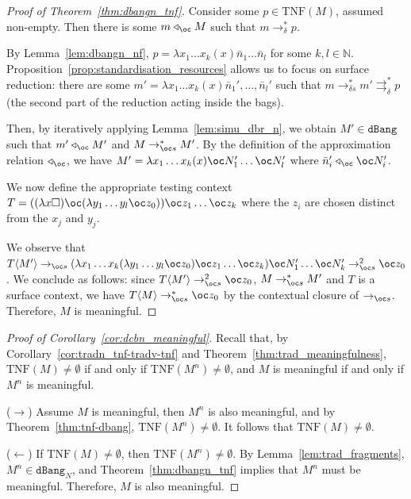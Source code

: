 \documentclass[10pt,a4paper]{article}
\newcommand{\<}{\langle}
\renewcommand{\>}{\rangle}
\newcommand{\dbang}{\ensuremath{\mathtt{dBang}}}
\newcommand{\dbangn}{\ensuremath{\dbang_N}}
\newcommand{\todbs}{\to_{\oc s}} %
\newcommand{\todbrs}{\to_{\delta s}} %
\newcommand{\todbrf}{\to_{\delta}} %
\newcommand{\totodbr}{\rightrightarrows_{\delta}} %
\newcommand{\tradn}[1]{\ensuremath{{#1}^n}}
\newcommand{\app}{\triangleleft_\oc} %
\newcommand{\taylornf}[1]{\ensuremath{\text{TNF}(#1)}}
\newcommand{\nativeemdash}{\ifmmode\text{\textemdash}\else\textemdash\fi}
\begin{document}
\begin{proof}[Proof of Theorem~\ref{thm:dbangn_tnf}]
	Consider some
	$p\in\taylornf M$, assumed non-empty. Then there is some $m\app M$ such
	that $m\todbrf^*p$.

	By Lemma~\ref{lem:dbangn_nf}, $p=\lambda x_1\dots x_k(x)\bar n_1\dots \bar n_l$
	for some $k,l\in\mathbb N$.
	Proposition~\ref{prop:standardisation_resources} allows us to focus on
	surface reduction: there are some $m'=\lambda
	x_1\dots x_k(x)\bar
	n_1',\dots ,\bar n_l'$ such that $m\todbrs^* m'\totodbr^* p$ (the second part
	of the reduction acting inside the bags).

	Then, by iteratively applying Lemma~\ref{lem:simu_dbr_n}, we obtain $M'\in\dbang$
	such that $m'\app M'$ and $M\todbs^*M'$. By the definition of
	the approximation relation $\app$, we have $M'=\lambda x_1\dots x_k(x)\oc
	N'_1\dots \oc N'_l$ where $\bar n_i'\app \oc N'_i$.


	We now define the appropriate testing context $T= ((\lambda x
	\square) \oc(\lambda y_1\dots y_l\oc z_0))\oc z_1\dots \oc z_k$
	where the $z_i$ are chosen distinct from the $x_j$ and $y_j$.

	We observe that $T\<M'\>\todbs (\lambda x_1\dots x_k(\lambda y_1\dots y_l\oc
	z_0)\oc z_1\dots \oc z_k)\oc N_1'\dots \oc N_k'\todbs^2\oc z_0$.
	We conclude as follows: since $T\<M'\>\todbs^2\oc z_0$, $M\todbs^*M'$ and $T$ is a surface
	context, we have $T\<M\>\todbs^*\oc z_0$ by the contextual closure of
	$\todbs$. Therefore, $M$ is meaningful.
\end{proof}

\begin{proof}[Proof of Corollary~\ref{cor:dcbn_meaningful}]
	Recall that, by Corollary~\ref{cor:tradn_tnf-tradv-tnf} and Theorem~\ref{thm:trad_meaningfulness}, 
	$\taylornf M\neq\emptyset$ if and
	only if $\taylornf {\tradn M}\neq\emptyset$, and $M$ is meaningful if
	and only if $\tradn M$ is meaningful.

	($\to$) Assume $M$ is meaningful, then $\tradn M$ is also meaningful, and
	by Theorem~\ref{thm:tnf-dbang}, $\taylornf{\tradn M}\neq \emptyset$.
	It follows that $\taylornf M\neq\emptyset$.

	($\leftarrow$) If $\taylornf M\neq\emptyset$, then $\taylornf{\tradn
	M}\neq\emptyset$. By Lemma~\ref{lem:trad_fragments}, $\tradn
	M\in\dbangn$, and Theorem~\ref{thm:dbangn_tnf} implies that $\tradn M$
	must be meaningful. Therefore, $M$ is also meaningful.
\end{proof}
\end{document}
